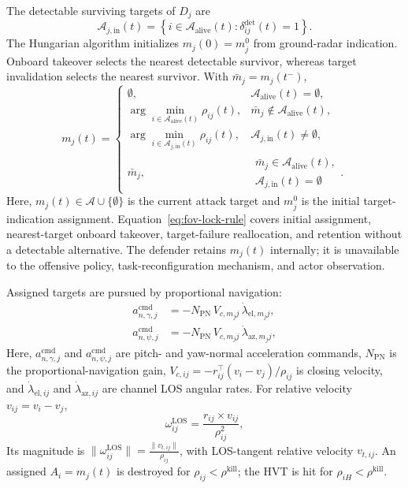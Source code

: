 \documentclass{cja}
\begin{document}
The detectable surviving targets of $D_j$ are
\begin{equation}
\mathcal A_{j,\mathrm{in}}(t)
=
\left\{
i\in\mathcal A_{\mathrm{alive}}(t):
\delta_{ij}^{\mathrm{det}}(t)=1
\right\}.
\label{eq:in-detect-set}
\end{equation}
The Hungarian algorithm initializes $m_j(0)=m_j^0$ from ground-radar indication. Onboard takeover selects the nearest detectable survivor, whereas target invalidation selects the nearest survivor. With $\bar m_j=m_j(t^-)$,
\begin{equation}
m_j(t)=
\begin{cases}
\emptyset,
& \mathcal A_{\mathrm{alive}}(t)=\emptyset,\\[1mm]
\displaystyle \arg\min_{i\in \mathcal A_{\mathrm{alive}}(t)}
\rho_{ij}(t),
& \bar m_j\notin \mathcal A_{\mathrm{alive}}(t),\\[3mm]
\displaystyle \arg\min_{i\in \mathcal A_{j,\mathrm{in}}(t)}
\rho_{ij}(t),
& \mathcal A_{j,\mathrm{in}}(t)\neq\emptyset,\\[3mm]
\bar m_j,
& \substack{\bar m_j\in \mathcal A_{\mathrm{alive}}(t),\\
\mathcal A_{j,\mathrm{in}}(t)=\emptyset}.
\end{cases}
\label{eq:fov-lock-rule}
\end{equation}
Here, $m_j(t)\in\mathcal A\cup\{\emptyset\}$ is the current attack target and $m_j^0$ is the initial target-indication assignment. Equation~\eqref{eq:fov-lock-rule} covers initial assignment, nearest-target onboard takeover, target-failure reallocation, and retention without a detectable alternative. The defender retains $m_j(t)$ internally; it is unavailable to the offensive policy, task-reconfiguration mechanism, and actor observation.

Assigned targets are pursued by proportional navigation:
\begin{equation}
\begin{aligned}
a_{n,\gamma,j}^{\mathrm{cmd}}
&=-N_{\mathrm{PN}}\,V_{c,m_j j}\,\dot\lambda_{\mathrm{el},m_j j},\\
a_{n,\psi,j}^{\mathrm{cmd}}
&=-N_{\mathrm{PN}}\,V_{c,m_j j}\,\dot\lambda_{\mathrm{az},m_j j},
\end{aligned}
\label{eq:def-guid-pn}
\end{equation}
Here, $a_{n,\gamma,j}^{\mathrm{cmd}}$ and $a_{n,\psi,j}^{\mathrm{cmd}}$ are pitch- and yaw-normal acceleration commands, $N_{\mathrm{PN}}$ is the proportional-navigation gain, $V_{c,ij}=-r_{ij}^\top(v_i-v_j)/\rho_{ij}$ is closing velocity, and $\dot\lambda_{\mathrm{el},ij}$ and $\dot\lambda_{\mathrm{az},ij}$ are channel LOS angular rates. For relative velocity $v_{ij}=v_i-v_j$,
\begin{equation}
\omega_{ij}^{\mathrm{LOS}} = \frac{r_{ij}\times v_{ij}}{\rho_{ij}^2},
\label{eq:omega_ij_def}
\end{equation}
Its magnitude is $\|\omega_{ij}^{\mathrm{LOS}}\| = \frac{\|v_{t,ij}\|}{\rho_{ij}}$, with LOS-tangent relative velocity $v_{t,ij}$. An assigned $A_i=m_j(t)$ is destroyed for $\rho_{ij}<\rho^{\mathrm{kill}}$; the HVT is hit for $\rho_{iH}<\rho^{\mathrm{kill}}$.
\end{document}
